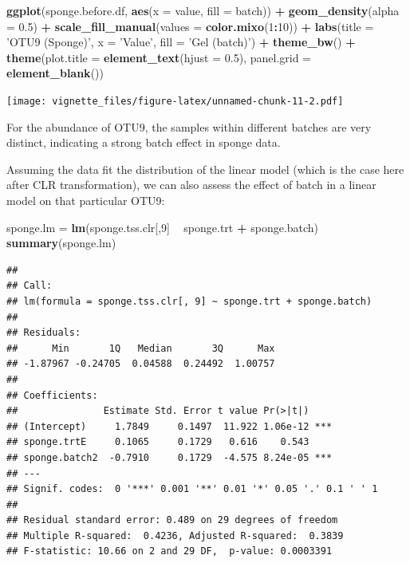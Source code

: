 \documentclass[]{book}
\newenvironment{Shaded}{\begin{snugshade}}{\end{snugshade}}
\newcommand{\KeywordTok}[1]{\textcolor[rgb]{0.13,0.29,0.53}{\textbf{#1}}}
\newcommand{\DataTypeTok}[1]{\textcolor[rgb]{0.13,0.29,0.53}{#1}}
\newcommand{\DecValTok}[1]{\textcolor[rgb]{0.00,0.00,0.81}{#1}}
\newcommand{\FloatTok}[1]{\textcolor[rgb]{0.00,0.00,0.81}{#1}}
\newcommand{\StringTok}[1]{\textcolor[rgb]{0.31,0.60,0.02}{#1}}
\newcommand{\OperatorTok}[1]{\textcolor[rgb]{0.81,0.36,0.00}{\textbf{#1}}}
\newcommand{\NormalTok}[1]{#1}
\begin{document}
\begin{Shaded}
\begin{Highlighting}[]
\KeywordTok{ggplot}\NormalTok{(sponge.before.df, }\KeywordTok{aes}\NormalTok{(}\DataTypeTok{x =}\NormalTok{ value, }\DataTypeTok{fill =}\NormalTok{ batch)) }\OperatorTok{+}\StringTok{ }
\StringTok{  }\KeywordTok{geom_density}\NormalTok{(}\DataTypeTok{alpha =} \FloatTok{0.5}\NormalTok{) }\OperatorTok{+}\StringTok{ }\KeywordTok{scale_fill_manual}\NormalTok{(}\DataTypeTok{values =} \KeywordTok{color.mixo}\NormalTok{(}\DecValTok{1}\OperatorTok{:}\DecValTok{10}\NormalTok{)) }\OperatorTok{+}\StringTok{ }
\StringTok{  }\KeywordTok{labs}\NormalTok{(}\DataTypeTok{title =} \StringTok{'OTU9 (Sponge)'}\NormalTok{, }\DataTypeTok{x =} \StringTok{'Value'}\NormalTok{, }\DataTypeTok{fill =} \StringTok{'Gel (batch)'}\NormalTok{) }\OperatorTok{+}\StringTok{ }
\StringTok{  }\KeywordTok{theme_bw}\NormalTok{() }\OperatorTok{+}\StringTok{ }\KeywordTok{theme}\NormalTok{(}\DataTypeTok{plot.title =} \KeywordTok{element_text}\NormalTok{(}\DataTypeTok{hjust =} \FloatTok{0.5}\NormalTok{), }
                     \DataTypeTok{panel.grid =} \KeywordTok{element_blank}\NormalTok{())}
\end{Highlighting}
\end{Shaded}

\texttt{[image: vignette\_files/figure-latex/unnamed-chunk-11-2.pdf]}

For the abundance of OTU9, the samples within different batches are very
distinct, indicating a strong batch effect in sponge data.

Assuming the data fit the distribution of the linear model (which is the
case here after CLR transformation), we can also assess the effect of
batch in a linear model on that particular OTU9:

\begin{Shaded}
\begin{Highlighting}[]
\NormalTok{sponge.lm =}\StringTok{ }\KeywordTok{lm}\NormalTok{(sponge.tss.clr[,}\DecValTok{9}\NormalTok{] }\OperatorTok{~}\StringTok{ }\NormalTok{sponge.trt }\OperatorTok{+}\StringTok{ }\NormalTok{sponge.batch)}
\KeywordTok{summary}\NormalTok{(sponge.lm)}
\end{Highlighting}
\end{Shaded}

\begin{verbatim}
## 
## Call:
## lm(formula = sponge.tss.clr[, 9] ~ sponge.trt + sponge.batch)
## 
## Residuals:
##      Min       1Q   Median       3Q      Max 
## -1.87967 -0.24705  0.04588  0.24492  1.00757 
## 
## Coefficients:
##               Estimate Std. Error t value Pr(>|t|)    
## (Intercept)     1.7849     0.1497  11.922 1.06e-12 ***
## sponge.trtE     0.1065     0.1729   0.616    0.543    
## sponge.batch2  -0.7910     0.1729  -4.575 8.24e-05 ***
## ---
## Signif. codes:  0 '***' 0.001 '**' 0.01 '*' 0.05 '.' 0.1 ' ' 1
## 
## Residual standard error: 0.489 on 29 degrees of freedom
## Multiple R-squared:  0.4236, Adjusted R-squared:  0.3839 
## F-statistic: 10.66 on 2 and 29 DF,  p-value: 0.0003391
\end{verbatim}
\end{document}
